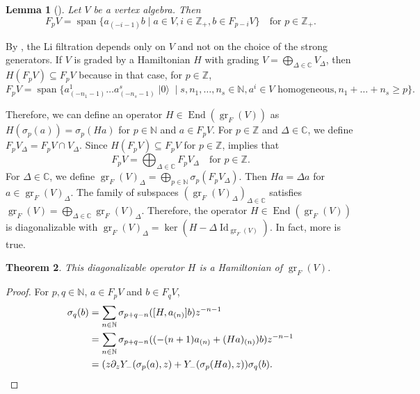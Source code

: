 \documentclass[a4paper, 12pt, reqno]{amsart}
\newtheorem{theorem}{Theorem}[section]
\newtheorem{lemma}[theorem]{Lemma}
\theoremstyle{remark}
\numberwithin{equation}{subsection}
\DeclareMathOperator{\Id}{Id}
\DeclareMathOperator{\gr}{gr}
\DeclareMathOperator{\End}{End}
\DeclareMathOperator{\vspan}{span}
\DeclareMathOperator{\vac}{|0\rangle}
\begin{document}
\begin{lemma}[{\cite[Lemma 2.9]{li_abelianizing_2005}}]
  \label{lmm:22}
  Let $V$ be a vertex algebra.
  Then
  \begin{equation*}
    F_pV = \vspan\{a_{(-i - 1)}b \mid a \in V, i \in \mathbb{Z}_+, b \in F_{p - i}V\} \quad \text{for }p \in \mathbb{Z}_+.
  \end{equation*}
\end{lemma}

By , the Li filtration depends only on $V$ and not on the choice of the strong generators.
If $V$ is graded by a Hamiltonian $H$ with grading $V = \bigoplus_{\Delta \in \mathbb{C}}V_{\Delta}$, then $H(F_pV) \subseteq F_pV$ because in that case, for $p \in \mathbb{Z}$,
\begin{equation*}
F_pV = \vspan \{a^1_{(-n_1 - 1)}\dots a^s_{(-n_s - 1)}\vac \mid s, n_1, \dots, n_s \in \mathbb{N}, a^i \in V\text{ homogeneous}, n_1 + \dots + n_s \ge p\}.
\end{equation*}

Therefore, we can define an operator $H \in \End(\gr_F(V))$ as $H(\sigma_p(a)) = \sigma_p(Ha)$ for $p \in \mathbb{N}$ and $a \in F_pV$.
For $p \in \mathbb{Z}$ and $\Delta \in \mathbb{C}$, we define $F_pV_{\Delta} = F_pV \cap V_{\Delta}$.
Since $H(F_pV) \subseteq F_pV$ for $p \in \mathbb{Z}$,  implies that
\begin{equation*}
  F_pV = \bigoplus_{\Delta \in \mathbb{C}}F_pV_{\Delta} \quad \text{for }p \in \mathbb{Z}.
\end{equation*}
For $\Delta \in \mathbb{C}$, we define $\gr_F(V)_{\Delta} = \bigoplus_{p \in \mathbb{N}}\sigma_p(F_pV_{\Delta})$.
Then $Ha = \Delta a$ for $a \in \gr_F(V)_{\Delta}$.
The family of subspaces $(\gr_F(V)_{\Delta})_{\Delta \in \mathbb{C}}$ satisfies $\gr_F(V) = \bigoplus_{\Delta \in \mathbb{C}} \gr_F(V)_{\Delta}$.
Therefore, the operator $H \in \End(\gr_F(V))$ is diagonalizable with $\gr_F(V)_{\Delta} = \ker(H - \Delta\Id_{\gr_F(V)})$.
In fact, more is true.

\begin{theorem}
  \label{thr:46}
  This diagonalizable operator $H$ is a Hamiltonian of $\gr_F(V)$.
\end{theorem}

\begin{proof}
  For $p, q \in \mathbb{N}$, $a \in F_pV$ and $b \in F_qV$,
  \begin{align*}
    [H, Y_-(\sigma_p(a), z)]\sigma_q(b) &= \sum_{n \in \mathbb{N}}\sigma_{p + q - n}([H, a_{(n)}]b)z^{-n - 1} \\
    &= \sum_{n \in \mathbb{N}}\sigma_{p + q - n}((-(n + 1)a_{(n)} + (Ha)_{(n)})b)z^{-n - 1} \\
    &= (z\partial_zY_-(\sigma_p(a), z) + Y_-(\sigma_p(Ha), z))\sigma_q(b). \qedhere
  \end{align*}
\end{proof}
\end{document}
